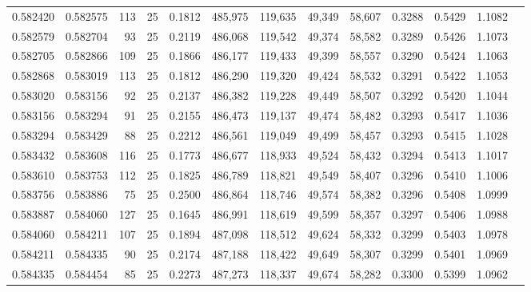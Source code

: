 \begin{tabular}{rrrrrrrrrrrrr}
0.582420 & 0.582575 &   113 &  25 &                                     0.1812 & 485,975 & 119,635 &  49,349 &  58,607 & 0.3288 & 0.5429 & 1.1082 \\
0.582579 & 0.582704 &    93 &  25 &                                     0.2119 & 486,068 & 119,542 &  49,374 &  58,582 & 0.3289 & 0.5426 & 1.1073 \\
0.582705 & 0.582866 &   109 &  25 &                                     0.1866 & 486,177 & 119,433 &  49,399 &  58,557 & 0.3290 & 0.5424 & 1.1063 \\
0.582868 & 0.583019 &   113 &  25 &                                     0.1812 & 486,290 & 119,320 &  49,424 &  58,532 & 0.3291 & 0.5422 & 1.1053 \\
0.583020 & 0.583156 &    92 &  25 &                                     0.2137 & 486,382 & 119,228 &  49,449 &  58,507 & 0.3292 & 0.5420 & 1.1044 \\
0.583156 & 0.583294 &    91 &  25 &                                     0.2155 & 486,473 & 119,137 &  49,474 &  58,482 & 0.3293 & 0.5417 & 1.1036 \\
0.583294 & 0.583429 &    88 &  25 &                                     0.2212 & 486,561 & 119,049 &  49,499 &  58,457 & 0.3293 & 0.5415 & 1.1028 \\
0.583432 & 0.583608 &   116 &  25 &                                     0.1773 & 486,677 & 118,933 &  49,524 &  58,432 & 0.3294 & 0.5413 & 1.1017 \\
0.583610 & 0.583753 &   112 &  25 &                                     0.1825 & 486,789 & 118,821 &  49,549 &  58,407 & 0.3296 & 0.5410 & 1.1006 \\
0.583756 & 0.583886 &    75 &  25 &                                     0.2500 & 486,864 & 118,746 &  49,574 &  58,382 & 0.3296 & 0.5408 & 1.0999 \\
0.583887 & 0.584060 &   127 &  25 &                                     0.1645 & 486,991 & 118,619 &  49,599 &  58,357 & 0.3297 & 0.5406 & 1.0988 \\
0.584060 & 0.584211 &   107 &  25 &                                     0.1894 & 487,098 & 118,512 &  49,624 &  58,332 & 0.3299 & 0.5403 & 1.0978 \\
0.584211 & 0.584335 &    90 &  25 &                                     0.2174 & 487,188 & 118,422 &  49,649 &  58,307 & 0.3299 & 0.5401 & 1.0969 \\
0.584335 & 0.584454 &    85 &  25 &                                     0.2273 & 487,273 & 118,337 &  49,674 &  58,282 & 0.3300 & 0.5399 & 1.0962 \\

\end{tabular}

